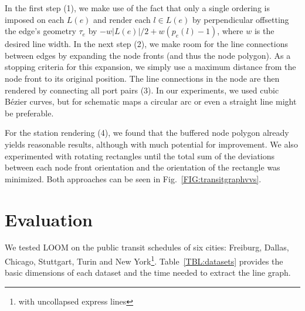 \documentclass[sigconf]{acmart}
\begin{document}
In the first step (1), we make use of the fact that only a single ordering is imposed on each $L(e)$ and render each $l \in L(e)$ by perpendicular offsetting the edge's geometry $\tau_{e}$ by $-w\left|L(e)\right|/2 + w\left(p_{e}(l)-1\right)$, where $w$ is the desired line width. In the next step (2), we make room for the line connections between edges by expanding the node fronts (and thus the node polygon). As a stopping criteria for this expansion, we simply use a maximum distance from the node front to its original position. The line connections in the node are then rendered by connecting all port pairs (3). In our experiments, we used cubic B\'ezier curves, but for schematic maps a circular arc or even a straight line might be preferable.

For the station rendering (4), we found that the buffered node polygon already yields reasonable results, although with much potential for improvement. We also experimented with rotating rectangles until the total sum of the deviations between each node front orientation and the orientation of the rectangle was minimized. Both approaches can be seen in Fig.~\ref{FIG:transitgraphvvs}.

%
\section{Evaluation}
%
We tested LOOM on the public transit schedules of six cities: Freiburg, Dallas, Chicago, Stuttgart, Turin and New York\footnote{with uncollapsed express lines}.
Table~\ref{TBL:datasets} provides the basic dimensions of each dataset and the time needed to extract the line graph.
\end{document}
